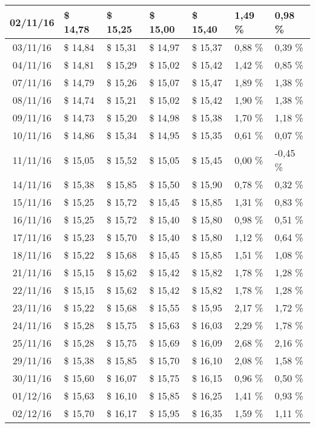 \begin{center}
\begin{longtable}{|c|p{1.5cm}|p{1.5cm}|p{1.5cm}|p{1.5cm}|p{1.5cm}|p{1.5cm}|}
02/11/16 & \$ 14,78 & \$ 15,25 & \$ 15,00 & \$ 15,40 & 1,49 \% & 0,98 \% \\ \hline
03/11/16 & \$ 14,84 & \$ 15,31 & \$ 14,97 & \$ 15,37 & 0,88 \% & 0,39 \% \\ \hline
04/11/16 & \$ 14,81 & \$ 15,29 & \$ 15,02 & \$ 15,42 & 1,42 \% & 0,85 \% \\ \hline
07/11/16 & \$ 14,79 & \$ 15,26 & \$ 15,07 & \$ 15,47 & 1,89 \% & 1,38 \% \\ \hline
08/11/16 & \$ 14,74 & \$ 15,21 & \$ 15,02 & \$ 15,42 & 1,90 \% & 1,38 \% \\ \hline
09/11/16 & \$ 14,73 & \$ 15,20 & \$ 14,98 & \$ 15,38 & 1,70 \% & 1,18 \% \\ \hline
10/11/16 & \$ 14,86 & \$ 15,34 & \$ 14,95 & \$ 15,35 & 0,61 \% & 0,07 \% \\ \hline
11/11/16 & \$ 15,05 & \$ 15,52 & \$ 15,05 & \$ 15,45 & 0,00 \% & -0,45 \% \\ \hline
14/11/16 & \$ 15,38 & \$ 15,85 & \$ 15,50 & \$ 15,90 & 0,78 \% & 0,32 \% \\ \hline
15/11/16 & \$ 15,25 & \$ 15,72 & \$ 15,45 & \$ 15,85 & 1,31 \% & 0,83 \% \\ \hline
16/11/16 & \$ 15,25 & \$ 15,72 & \$ 15,40 & \$ 15,80 & 0,98 \% & 0,51 \% \\ \hline
17/11/16 & \$ 15,23 & \$ 15,70 & \$ 15,40 & \$ 15,80 & 1,12 \% & 0,64 \% \\ \hline
18/11/16 & \$ 15,22 & \$ 15,68 & \$ 15,45 & \$ 15,85 & 1,51 \% & 1,08 \% \\ \hline
21/11/16 & \$ 15,15 & \$ 15,62 & \$ 15,42 & \$ 15,82 & 1,78 \% & 1,28 \% \\ \hline
22/11/16 & \$ 15,15 & \$ 15,62 & \$ 15,42 & \$ 15,82 & 1,78 \% & 1,28 \% \\ \hline
23/11/16 & \$ 15,22 & \$ 15,68 & \$ 15,55 & \$ 15,95 & 2,17 \% & 1,72 \% \\ \hline
24/11/16 & \$ 15,28 & \$ 15,75 & \$ 15,63 & \$ 16,03 & 2,29 \% & 1,78 \% \\ \hline
25/11/16 & \$ 15,28 & \$ 15,75 & \$ 15,69 & \$ 16,09 & 2,68 \% & 2,16 \% \\ \hline
29/11/16 & \$ 15,38 & \$ 15,85 & \$ 15,70 & \$ 16,10 & 2,08 \% & 1,58 \% \\ \hline
30/11/16 & \$ 15,60 & \$ 16,07 & \$ 15,75 & \$ 16,15 & 0,96 \% & 0,50 \% \\ \hline
01/12/16 & \$ 15,63 & \$ 16,10 & \$ 15,85 & \$ 16,25 & 1,41 \% & 0,93 \% \\ \hline
02/12/16 & \$ 15,70 & \$ 16,17 & \$ 15,95 & \$ 16,35 & 1,59 \% & 1,11 \% \\ \hline

\end{longtable}
\end{center}
